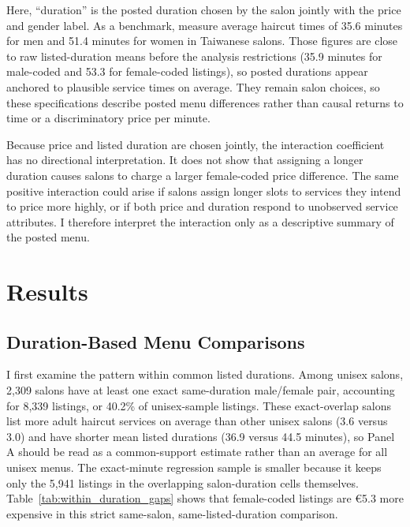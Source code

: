 \documentclass[12pt,a4paper]{article}
\begin{document}
Here, ``duration'' is the posted duration chosen by the salon jointly with the price and gender label. As a benchmark, \citet{CHEN201098} measure average haircut times of 35.6 minutes for men and 51.4 minutes for women in Taiwanese salons. Those figures are close to raw listed-duration means before the analysis restrictions (35.9 minutes for male-coded and 53.3 for female-coded listings), so posted durations appear anchored to plausible service times on average. They remain salon choices, so these specifications describe posted menu differences rather than causal returns to time or a discriminatory price per minute.

Because price and listed duration are chosen jointly, the interaction coefficient has no directional interpretation. It does not show that assigning a longer duration causes salons to charge a larger female-coded price difference. The same positive interaction could arise if salons assign longer slots to services they intend to price more highly, or if both price and duration respond to unobserved service attributes. I therefore interpret the interaction only as a descriptive summary of the posted menu.

\section{Results}

\subsection{Duration-Based Menu Comparisons}

I first examine the pattern within common listed durations. Among unisex salons, 2,309 salons have at least one exact same-duration male/female pair, accounting for 8,339 listings, or 40.2\% of unisex-sample listings. These exact-overlap salons list more adult haircut services on average than other unisex salons (3.6 versus 3.0) and have shorter mean listed durations (36.9 versus 44.5 minutes), so Panel A should be read as a common-support estimate rather than an average for all unisex menus. The exact-minute regression sample is smaller because it keeps only the 5,941 listings in the overlapping salon-duration cells themselves. Table~\ref{tab:within_duration_gaps} shows that female-coded listings are €5.3 more expensive in this strict same-salon, same-listed-duration comparison.
\end{document}
